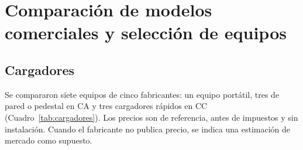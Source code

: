 \section{Comparación de modelos comerciales y selección de equipos}
\label{sec:equipos}

\subsection{Cargadores}
Se compararon siete equipos de cinco fabricantes: un equipo portátil, tres de pared o pedestal en CA y tres cargadores rápidos en CC (Cuadro~\ref{tab:cargadores}). Los precios son de referencia, antes de impuestos y sin instalación. Cuando el fabricante no publica precio, se indica una estimación de mercado como supuesto.

